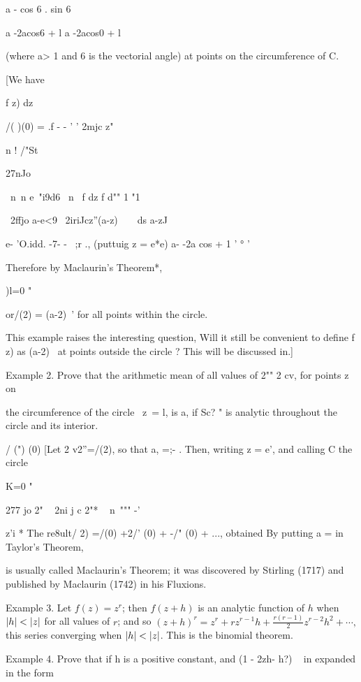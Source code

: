 {{a - cos 6 . sin 6

a -2acos6 + l a -2acos0 + l

(where a> 1 and 6 is the vectorial angle) at points on the
circumference of C.

[We have

f z) dz

/( )(0) = .f - - ' ' 2mjc z"

n ! /"St

27nJo

\ n\ n e~"i9d6 \ n \ f dz f d"" 1 "1

~2ffjo a-e<9 ~2iriJcz''(a-z)~~\ \ ds a-zJ

e- 'O.idd. -7- - ~;r ., (puttuig z = e*e) a- -2a cos + 1 ' ° '

Therefore by Maclaurin's Theorem*,

)l=0 "

or/(2) = (a-2)~' for all points within the circle.

This example raises the interesting question, Will it still be
convenient to define f z) as (a-2)~ at points outside the circle ?
This will be discussed in.]

Example 2. Prove that the arithmetic mean of all values of 2"" 2 cv,
for points z on

the circumference of the circle \ z\ = l, is a, if Sc? " is analytic
throughout the circle and its interior.

/ (") (0) [Let 2 v2''=/(2), so that a, =;- . Then, writing z = e',
and calling C the circle

K=0 "

277 jo 2" ~ 2ni j c 2"* ~ n\ """ -'

z'i * The re8ult/ 2) =/(0) +2/' (0) + -/" (0) + ..., obtained By
putting a = in Taylor's Theorem,

is usually called Maclaurin's Theorem; it was discovered by Stirling
(1717) and published by Maclaurin (1742) in his Fluxions.

%
%

Example 3. Let $f(z) = z^{r}$; then $f(z+h)$ is an analytic function
of $h$ when $\left| h \right| < \left| z \right|$ for all values of $r$; and so
$(z + h)^{r} = z^{r} + rz^{r-1} h + \frac{ r (r-1) }{2} z^{r-2} h^{2}
+ \cdots, $ this series converging when $\left| h \right| < \left| z \right|$.
This is the binomial theorem.

Example 4. Prove that if h is a positive constant, and (1 - 2zh- h?) ~
in expanded in the form

}}
